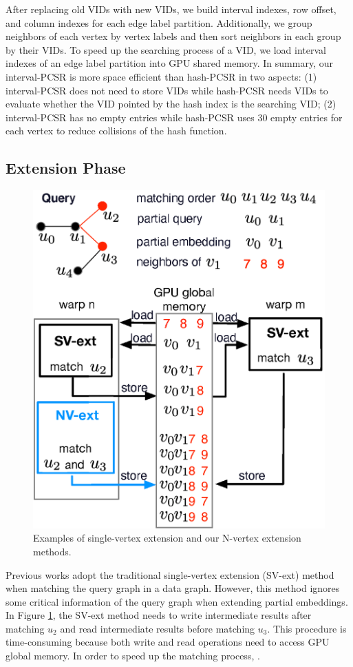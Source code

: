 After replacing old VIDs with new VIDs, we build interval indexes, row offset, and column indexes for each edge label partition. Additionally, we group neighbors of each vertex by vertex labels and then sort neighbors in each group by their VIDs. To speed up the searching process of a VID, we load interval indexes of an edge label partition into GPU shared memory. In summary, our interval-PCSR is more space efficient than hash-PCSR in two aspects: (1) interval-PCSR does not need to store VIDs while hash-PCSR needs VIDs to evaluate whether the VID pointed by the hash index is the searching VID; (2) interval-PCSR has no empty entries while hash-PCSR uses 30 empty entries for each vertex to reduce collisions of the hash function.


\subsection{Extension Phase}
\begin{figure}
\centering
\includegraphics[width=0.9\columnwidth]{./figure/doubleext.eps}
\caption{Examples of single-vertex extension and our N-vertex extension methods.}	
\label{fig:doubleext}
\end{figure}
Previous works \cite{zeng2020gsi,sun2020subgraph} adopt the traditional single-vertex extension (SV-ext) method when matching the query graph in a data graph. However, this method ignores some critical information of the query graph when extending partial embeddings. In Figure \ref{fig:doubleext}, the SV-ext method needs to write intermediate results after matching $u_2$ and read intermediate results before matching $u_3$. This procedure is time-consuming because both write and read operations need to access GPU global memory. In order to speed up the matching process, .


